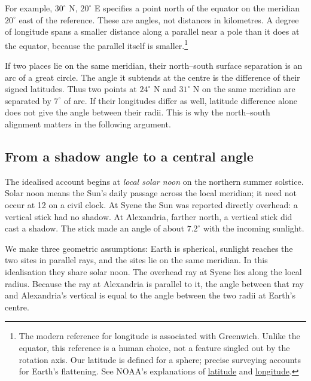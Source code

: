 For example, $30^\circ$ N, $20^\circ$ E specifies a point north of the
equator on the meridian $20^\circ$ east of the reference. These are angles,
not distances in kilometres. A degree of longitude spans a smaller distance
along a parallel near a pole than it does at the equator, because the
parallel itself is smaller.\footnote{The modern reference for longitude
is associated with Greenwich. Unlike the equator, this reference is a
human choice, not a feature singled out by the rotation axis. Our latitude
is defined for a sphere; precise surveying accounts for Earth's flattening.
See NOAA's explanations of
\href{https://oceanservice.noaa.gov/facts/latitude.html}{latitude} and
\href{https://oceanservice.noaa.gov/facts/longitude.html}{longitude}.}

If two places lie on the same meridian, their north--south surface
separation is an arc of a great circle. The angle it subtends at the centre
is the difference of their signed latitudes. Thus two points at $24^\circ$ N
and $31^\circ$ N on the same meridian are separated by $7^\circ$ of arc.
If their longitudes differ as well, latitude difference alone does not give
the angle between their radii. This is why the north--south alignment
matters in the following argument.

\subsection{From a shadow angle to a central angle}
The idealised account begins at \emph{local solar noon} on the northern
summer solstice. Solar noon means the Sun's daily passage across the local
meridian; it need not occur at 12 on a civil clock. At Syene the Sun was
reported directly overhead: a vertical stick had no shadow. At Alexandria,
farther north, a vertical stick did cast a shadow. The stick made an
angle of about $7.2^\circ$ with the incoming sunlight.

We make three geometric assumptions: Earth is spherical, sunlight reaches
the two sites in parallel rays, and the sites lie on the same meridian.
In this idealisation they share solar noon. The overhead ray at Syene
lies along the local radius. Because the ray at Alexandria is parallel
to it, the angle between that ray and Alexandria's vertical is equal to
the angle between the two radii at Earth's centre.

